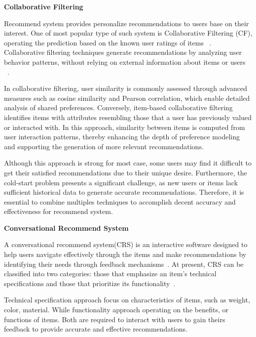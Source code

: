 \begin{flushleft}
	\textbf{Collaborative Filtering}
\end{flushleft}
Recommend system provides personalize recommendations to users base on their interest. One of most popular type of such system is Collaborative Filtering (CF), operating the prediction based on the known user ratings of items ~\parencite{zhang2014}. Collaborative filtering techniques generate recommendations by analyzing user behavior patterns, without relying on external information about items or users ~\parencite{Koren2022}.

In collaborative filtering, user similarity is commonly assessed through advanced measures such as cosine similarity and Pearson correlation, which enable detailed analysis of shared preferences. Conversely, item-based collaborative filtering identifies items with attributes resembling those that a user has previously valued or interacted with. In this approach, similarity between items is computed from user interaction patterns, thereby enhancing the depth of preference modeling and supporting the generation of more relevant recommendations.

Although this approach is strong for most case, some users may find it difficult to get their satisfied recommendations due to their unique desire. Furthermore, the cold-start problem presents a significant challenge, as new users or items lack sufficient historical data to generate accurate recommendations. Therefore, it is essential to combine multiples techniques to accomplish decent accuracy and effectiveness for recommend system.

\begin{flushleft}
	\textbf{Conversational Recommend System}
\end{flushleft}
A conversational recommend system(CRS) is an interactive software designed to help users navigate effectively through the items and make recommendations by identifying their needs through feedback mechanisms~\parencite{inproceedings}. At present, CRS can be classified into two categories: those that emphasize an item’s technical specifications and those that prioritize its functionality~\parencite{ayundhita2019}.

Technical specification approach focus on characteristics of items, such as weight, color, material. While functionality approach operating on the benefits, or functions of items. Both are required to interact with users to gain theirs feedback to provide accurate and effective recommendations.


